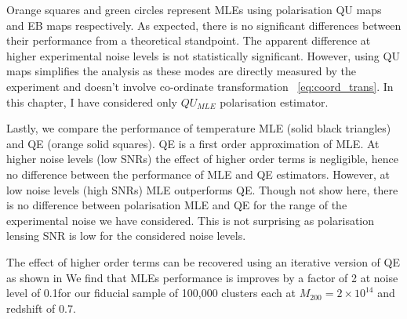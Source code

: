  Orange squares and green circles represent MLEs using polarisation QU maps and EB maps respectively. 
 As expected, there is no significant differences between their performance from a theoretical standpoint. 
 The apparent difference at higher experimental noise levels is not statistically significant.
 However, using QU maps simplifies the analysis as these modes are directly measured by the experiment and doesn't involve co-ordinate transformation ~\ref{eq:coord_trans}. In this chapter, I have considered only $QU_{MLE}$ polarisation estimator.
 
  
 Lastly, we compare the performance of temperature MLE (solid black triangles) and QE (orange solid squares). 
 QE is a first order approximation of MLE.
 At higher noise levels (low SNRs) the effect of higher order terms is negligible, hence no difference between the performance of MLE and QE estimators.
 However, at low noise levels (high SNRs) MLE outperforms QE. 
  Though not show here, there is no difference between polarisation MLE and QE for the range of the experimental noise we have considered.
  This is not surprising as polarisation lensing SNR is low for the considered noise levels.
 
 The effect of higher order terms can be recovered using an iterative version of QE as shown in %
 We find that MLEs performance is improves by a factor of 2 at noise level of 0.1\ukam  for our fiducial sample of 100,000 clusters each at  $M_{200} = 2 \times 10^{14}$ \msolar and redshift of 0.7. 
  
